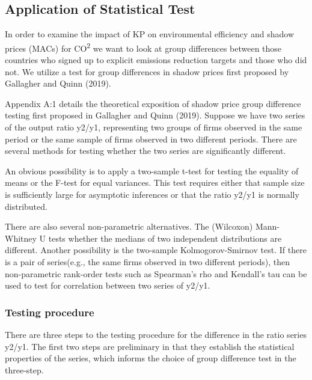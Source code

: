 \documentclass[
  10pt,
]{article}
\begin{document}
\hypertarget{application-of-statistical-test}{%
\subsection{Application of Statistical
Test}\label{application-of-statistical-test}}

In order to examine the impact of KP on environmental efficiency and shadow prices (MACs) for CO\textsuperscript{2} we want to look at group differences between those countries who signed up to explicit emissions reduction targets and those who did not. We utilize a test for group differences in shadow prices first proposed by Gallagher and Quinn (2019).

Appendix A:1 details the theoretical exposition of shadow price group
difference testing first proposed in Gallagher and Quinn (2019). Suppose
we have two series of the output ratio y2/y1, representing two groups of
firms observed in the same period or the same sample of firms observed
in two different periods. There are several methods for testing whether
the two series are significantly different.

An obvious possibility is to apply a two-sample t-test for testing the
equality of means or the F-test for equal variances. This test requires
either that sample size is sufficiently large for asymptotic inferences
or that the ratio y2/y1 is normally distributed.

There are also several non-parametric alternatives. The (Wilcoxon)
Mann-Whitney U tests whether the medians of two independent
distributions are different. Another possibility is the two-sample
Kolmogorov-Smirnov test. If there is a pair of series(e.g., the same
firms observed in two different periods), then non-parametric rank-order
tests such as Spearman's rho and Kendall's tau can be used to test for
correlation between two series of y2/y1.

\hypertarget{testing-procedure}{%
\subsubsection{Testing procedure}\label{testing-procedure}}

There are three steps to the testing procedure for the difference in the
ratio series y2/y1. The first two steps are preliminary in that they
establish the statistical properties of the series, which informs the
choice of group difference test in the three-step.
\end{document}
